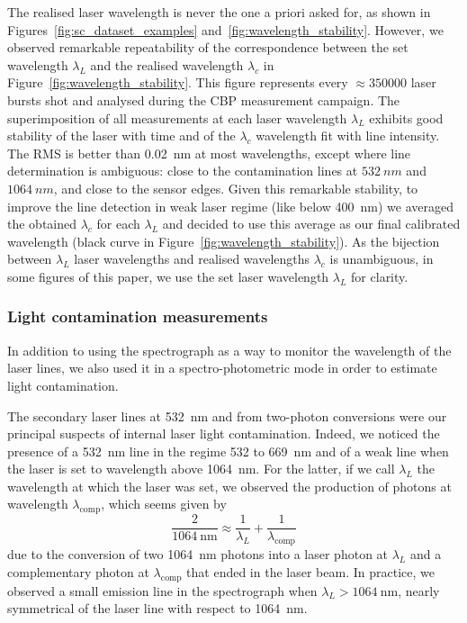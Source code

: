 The realised laser wavelength is never the one a priori asked for, as shown in Figures~\ref{fig:sc_dataset_examples} and~\ref{fig:wavelength_stability}. However, we observed remarkable repeatability of the correspondence between the set wavelength $\lambda_L$ and the realised wavelength $\lambda_c$ in Figure~\ref{fig:wavelength_stability}. This figure represents every $\approx\num{350000}$ laser bursts shot and analysed during the CBP measurement campaign. The superimposition of all measurements at each laser wavelength $\lambda_L$ exhibits good stability of the laser with time and of the $\lambda_c$ wavelength fit with line intensity. The RMS is better than \SI{0.02}{\nm} at most wavelengths, except where line determination is ambiguous: close to the contamination lines at $\SI{532}{nm}$ and $\SI{1064}{nm}$, and close to the sensor edges. Given this remarkable stability, to improve the line detection in weak laser regime (like below \SI{400}{\nm}) we averaged the obtained $\lambda_c$ for each $\lambda_L$ and decided to use this average as our final calibrated wavelength (black curve in Figure~\ref{fig:wavelength_stability}). As the bijection between $\lambda_L$ laser wavelengths and realised wavelengths $\lambda_c$ is unambiguous, in some figures of this paper, we use the set laser wavelength $\lambda_L$ for clarity. 




\subsubsection{Light contamination measurements}
\label{lightcontamination}
In addition to using the spectrograph as a way to monitor the wavelength of the laser lines, we also used it in a spectro-photometric mode in order to estimate light contamination.


The secondary laser lines at \SI{532}{\nm} and from two-photon conversions were our principal suspects of internal laser light contamination. Indeed, we noticed the presence of a \SI{532}{\nm} line in the regime 532 to \SI{669}{\nm} and of a weak line when the laser is set to wavelength above \SI{1064}{\nm}. For the latter, if we call $\lambda_L$ the wavelength at which the laser was set, we observed the production of photons at wavelength $\lambda_{\text{comp}}$, which seems given by
\begin{equation}
 \frac{2}{\SI{1064}{\nm}} \approx \frac{1}{\lambda_L} + \frac{1}{\lambda_{\text{comp}}}
 \end{equation} 
 due to the conversion of two \SI{1064}{\nm} photons into a laser photon at $\lambda_L$ and a complementary photon at $\lambda_{\text{comp}}$ that ended in the laser beam. In practice, we observed a small emission line in the spectrograph when $\lambda_L > \SI{1064}{\nm}$, nearly symmetrical of the laser line with respect to \SI{1064}{\nm}.


